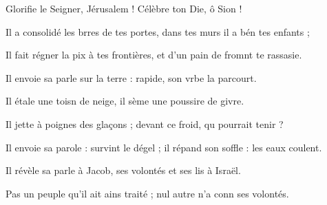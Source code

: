 \item Glorifie le Seigner, Jérusalem !\psstar{} Célèbre ton Die, ô Sion !
\item Il a consolidé les brres de tes portes,\psstar{} dans tes murs il a bén tes enfants ;
\item Il fait régner la pix à tes frontières,\psstar{} et d’un pain de fromnt te rassasie.
\item Il envoie sa parle sur la terre :\psstar{} rapide, son vrbe la parcourt.
\item Il étale une toisn de neige,\psstar{} il sème une poussire de givre.
\item Il jette à poignes des glaçons ;\psstar{} devant ce froid, qu pourrait tenir ?
\item Il envoie sa parole : survint le dégel ;\psstar{} il répand son soffle : les eaux coulent.
\item Il révèle sa parle à Jacob,\psstar{} ses volontés et ses lis à Israël.
\item Pas un peuple qu’il ait ains traité ;\psstar{} nul autre n’a conn ses volontés.